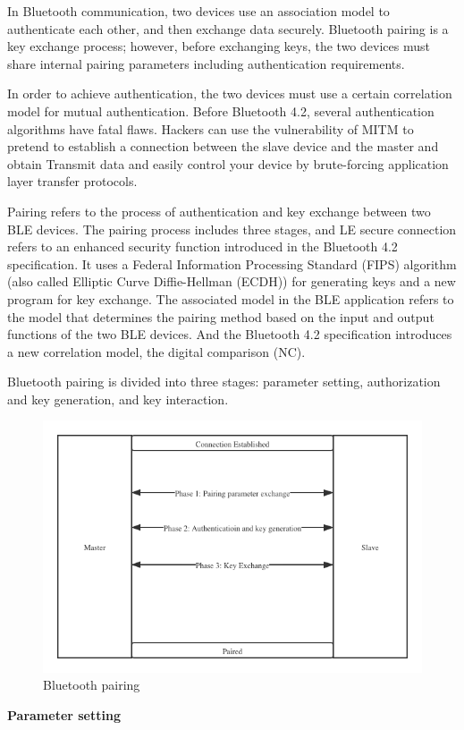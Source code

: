 \documentclass[11pt,en]{elegantpaper}
\begin{document}
In Bluetooth communication, two devices use an association model to authenticate each other, and then exchange data securely. Bluetooth pairing is a key exchange process; however, before exchanging keys, the two devices must share internal pairing parameters including authentication requirements\cite{scarfone2008guide}.

In order to achieve authentication, the two devices must use a certain correlation model for mutual authentication. Before Bluetooth 4.2, several authentication algorithms have fatal flaws. Hackers can use the vulnerability of MITM to pretend to establish a connection between the slave device and the master and obtain Transmit data and easily control your device by brute-forcing application layer transfer protocols.

Pairing refers to the process of authentication and key exchange between two BLE devices. The pairing process includes three stages, and LE secure connection refers to an enhanced security function introduced in the Bluetooth 4.2 specification. It uses a Federal Information Processing Standard (FIPS) algorithm (also called Elliptic Curve Diffie-Hellman (ECDH)) for generating keys and a new program for key exchange. The associated model in the BLE application refers to the model that determines the pairing method based on the input and output functions of the two BLE devices. And the Bluetooth 4.2 specification introduces a new correlation model, the digital comparison (NC).

Bluetooth pairing is divided into three stages: parameter setting, authorization and key generation, and key interaction.

\begin{figure}[h]
	\centering
	\includegraphics[width=0.7\linewidth]{figure/auble}
	\caption{Bluetooth pairing}
	\label{fig:fig1}
\end{figure}

\noindent\textbf{Parameter setting}
\end{document}
